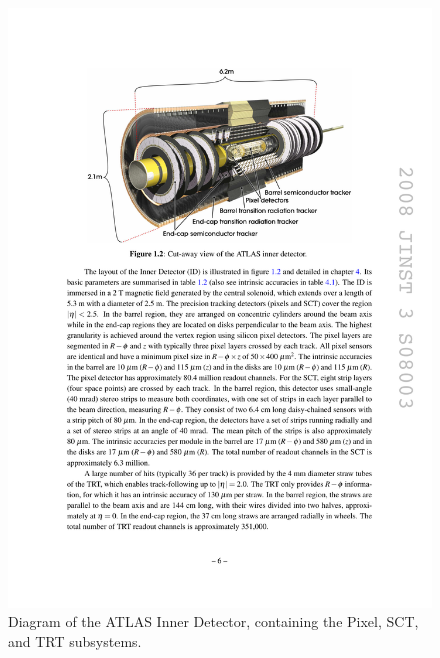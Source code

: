 \begin{centering}
\begin{figure}[bth]
\myfloatalign
\includegraphics[width=.90\linewidth]{figures/atlas/innerdetector.pdf}
\caption{Diagram of the ATLAS Inner Detector, containing the Pixel, SCT, and TRT subsystems.}
\label{fig:ID}
\end{figure}
\end{centering}

